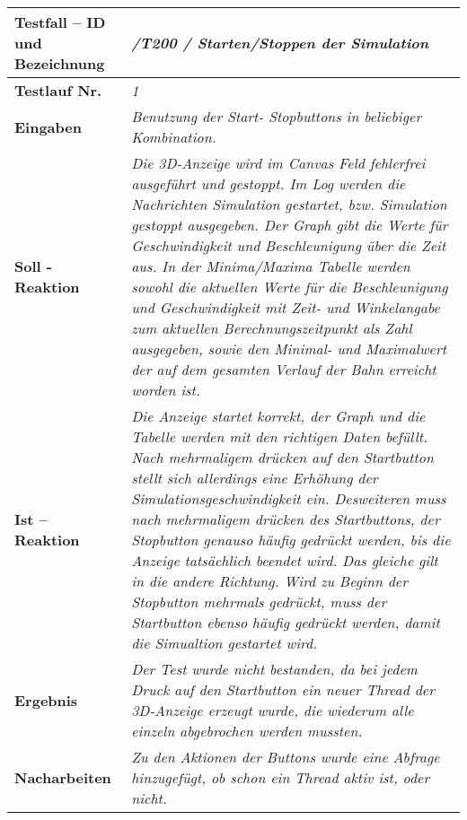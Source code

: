 \begin{longtable}{|p{7cm}|p{10cm}|}
\hline
\textbf{Testfall -- ID und Bezeichnung} & \textit{ /T200 / Starten/Stoppen der Simulation} \\
\hline
\textbf{Testlauf Nr.} & \textit{1} \\
\hline
\textbf{Eingaben} & \textit{Benutzung der Start- Stopbuttons in beliebiger Kombination.} \\
\hline
\textbf{Soll - Reaktion} & \textit{Die 3D-Anzeige wird im Canvas Feld fehlerfrei ausgeführt und gestoppt. Im Log werden die Nachrichten Simulation gestartet, bzw. Simulation gestoppt ausgegeben.
Der Graph gibt die Werte für Geschwindigkeit und Beschleunigung über die Zeit aus. In der Minima/Maxima Tabelle werden sowohl die aktuellen Werte für die Beschleunigung und Geschwindigkeit mit 
Zeit- und Winkelangabe zum aktuellen Berechnungszeitpunkt als Zahl ausgegeben, sowie den Minimal- und Maximalwert der auf dem gesamten Verlauf der Bahn erreicht worden ist.
} \\
\hline
\textbf{Ist -- Reaktion} & \textit{Die Anzeige startet korrekt, der Graph und die Tabelle werden mit den richtigen Daten befüllt. Nach mehrmaligem drücken auf den Startbutton stellt sich allerdings 
eine Erhöhung der Simulationsgeschwindigkeit ein. Desweiteren muss nach mehrmaligem drücken des Startbuttons, der Stopbutton genauso häufig gedrückt werden, bis die Anzeige tatsächlich beendet wird.
Das gleiche gilt in die andere Richtung. Wird zu Beginn der Stopbutton mehrmals gedrückt, muss der Startbutton ebenso häufig gedrückt werden, damit die Simualtion gestartet wird.} \\
\hline
\textbf{Ergebnis} & \textit{Der Test wurde nicht bestanden, da bei jedem Druck auf den Startbutton ein neuer Thread der 3D-Anzeige erzeugt wurde, die wiederum alle einzeln abgebrochen werden mussten.} \\
\hline
\textbf{Nacharbeiten } & \textit{Zu den Aktionen der Buttons wurde eine Abfrage hinzugefügt, ob schon ein Thread aktiv ist, oder nicht.} \\
\hline
 \end{longtable}

